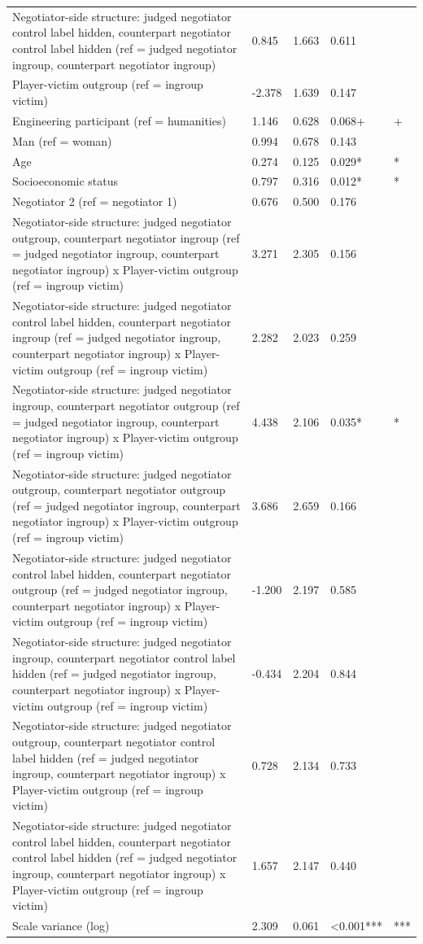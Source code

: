 \documentclass[11pt]{article}
\begin{document}
\begin{table}[H]
{\begin{tabular}{lllll}
Negotiator-side structure: judged negotiator control label hidden, counterpart negotiator control label hidden (ref = judged negotiator ingroup, counterpart negotiator ingroup) & 0.845 & 1.663 & 0.611 &  \\
Player-victim outgroup (ref = ingroup victim) & -2.378 & 1.639 & 0.147 &  \\
Engineering participant (ref = humanities) & 1.146 & 0.628 & 0.068+ & + \\
Man (ref = woman) & 0.994 & 0.678 & 0.143 &  \\
Age & 0.274 & 0.125 & 0.029* & * \\
Socioeconomic status & 0.797 & 0.316 & 0.012* & * \\
Negotiator 2 (ref = negotiator 1) & 0.676 & 0.500 & 0.176 &  \\
Negotiator-side structure: judged negotiator outgroup, counterpart negotiator ingroup (ref = judged negotiator ingroup, counterpart negotiator ingroup) x Player-victim outgroup (ref = ingroup victim) & 3.271 & 2.305 & 0.156 &  \\
Negotiator-side structure: judged negotiator control label hidden, counterpart negotiator ingroup (ref = judged negotiator ingroup, counterpart negotiator ingroup) x Player-victim outgroup (ref = ingroup victim) & 2.282 & 2.023 & 0.259 &  \\
Negotiator-side structure: judged negotiator ingroup, counterpart negotiator outgroup (ref = judged negotiator ingroup, counterpart negotiator ingroup) x Player-victim outgroup (ref = ingroup victim) & 4.438 & 2.106 & 0.035* & * \\
Negotiator-side structure: judged negotiator outgroup, counterpart negotiator outgroup (ref = judged negotiator ingroup, counterpart negotiator ingroup) x Player-victim outgroup (ref = ingroup victim) & 3.686 & 2.659 & 0.166 &  \\
Negotiator-side structure: judged negotiator control label hidden, counterpart negotiator outgroup (ref = judged negotiator ingroup, counterpart negotiator ingroup) x Player-victim outgroup (ref = ingroup victim) & -1.200 & 2.197 & 0.585 &  \\
Negotiator-side structure: judged negotiator ingroup, counterpart negotiator control label hidden (ref = judged negotiator ingroup, counterpart negotiator ingroup) x Player-victim outgroup (ref = ingroup victim) & -0.434 & 2.204 & 0.844 &  \\
Negotiator-side structure: judged negotiator outgroup, counterpart negotiator control label hidden (ref = judged negotiator ingroup, counterpart negotiator ingroup) x Player-victim outgroup (ref = ingroup victim) & 0.728 & 2.134 & 0.733 &  \\
Negotiator-side structure: judged negotiator control label hidden, counterpart negotiator control label hidden (ref = judged negotiator ingroup, counterpart negotiator ingroup) x Player-victim outgroup (ref = ingroup victim) & 1.657 & 2.147 & 0.440 &  \\
Scale variance (log) & 2.309 & 0.061 & <0.001*** & *** \\
\bottomrule
\end{tabular}
}
\end{table}
\end{document}
